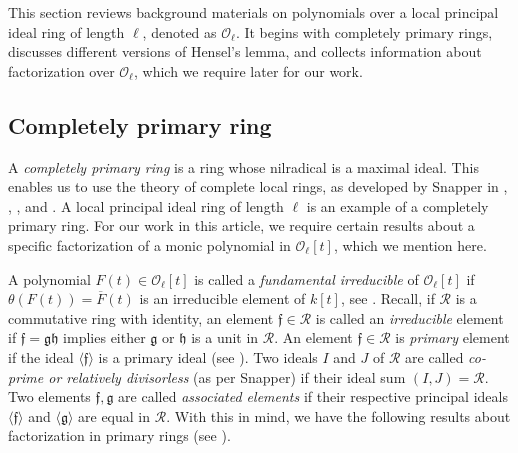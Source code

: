 \documentclass[11pt,twoside]{amsart}
\theoremstyle{definition} %
\begin{document}
This section reviews background materials on polynomials over a local principal ideal ring of length $\ell$, denoted as $\mathscr O_\ell$. It begins with completely primary rings, discusses different versions of Hensel's lemma, and collects information about factorization over $\mathscr O_\ell$, which we require later for our work.

\subsection{Completely primary ring}
A \emph{completely primary ring} is a ring whose nilradical is a maximal ideal. This enables us to use the theory of complete local rings, as developed by Snapper in \cite{Snapper1950}, \cite{Snapper1951a}, \cite{Snapper1951b}, and \cite{Snapper1952}. A local principal ideal ring of length $\ell$ is an example of a completely primary ring. For our work in this article, we require certain results about a specific factorization of a monic polynomial in $\mathscr O_\ell[t]$, which we mention here.  

A polynomial $F(t) \in\mathscr O_\ell[t]$ is called a \emph{fundamental irreducible} of $\mathscr O_\ell[t]$ if $\theta(F(t)) = \overline{ F}(t)$ is an irreducible element of $k[t]$, see \cite[Definition 2.1]{Snapper1950}. 
Recall, if $\mathscr R$ is a commutative ring with identity, an element $\mathfrak{f}\in\mathscr R$ is called an \emph{irreducible} element if  $\mathfrak{f}=\mathfrak{g} \mathfrak{h}$ implies either $\mathfrak{g}$ or $\mathfrak{h}$ is a unit in $\mathscr R$.
An element $\mathfrak{f}\in\mathscr R$ is \emph{primary} element if the ideal $\langle \mathfrak{f}\rangle$ is a primary ideal (see \cite[p. 50]{AtiyahMacBook69}). 
Two ideals $I$ and $J$ of $\mathscr R$ are called \emph{co-prime or relatively divisorless} (as per Snapper) if their ideal sum $(I, J)=\mathscr R$. 
Two elements $\mathfrak{f},\mathfrak{g}$ are called \emph{associated elements} if their respective principal ideals $\langle\mathfrak{f}\rangle$ and $\langle\mathfrak{g}\rangle$ are equal in $\mathscr R$. 
With this in mind, we have the following results about factorization in primary rings (see \cite[Theorem 5.1]{Snapper1950}).
\end{document}
